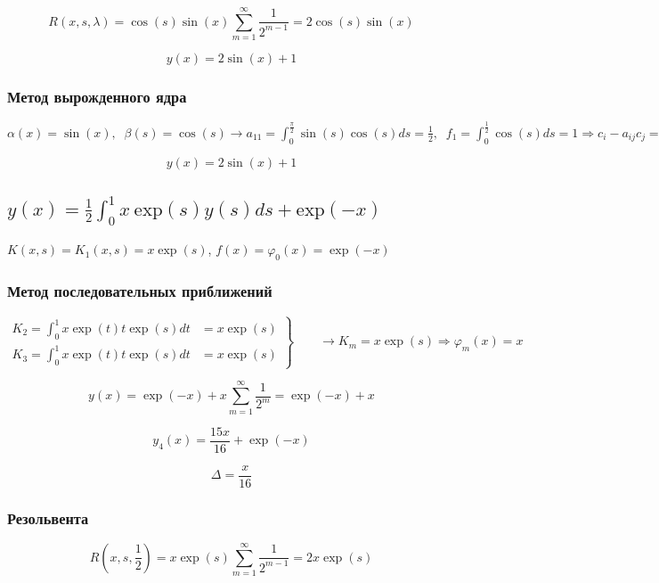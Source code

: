\documentclass[
11pt,
master, %
subf, %
href, %
colorlinks=true, %
times, %
]{disser}
\begin{document}
$$R(x,s,\lambda) = \cos(s)\sin(x)\sum_{m=1}^{\infty} \frac{1}{2^{m-1}} = 2\cos(s)\sin(x)$$

$$y(x) = 2\sin(x) + 1$$

\subsubsection{Метод вырожденного ядра}

$\displaystyle\alpha(x) = \sin(x),\;\;\beta(s) = \cos(s) \rightarrow a_{11} = \int_{0}^{\frac{\pi}{2}} \sin(s) \cos(s) ds = \frac{1}{2}, \;\; f_1 = \int_{0}^{\frac{1}{2}} \cos(s)ds = 1 \Rightarrow c_i - a_{ij} c_j = f_i \Longleftrightarrow c_1 = 2$

$$y(x) = 2\sin(x) + 1$$

\subsection{$\displaystyle y(x) = \frac{1}{2} \int_{0}^{1} x~ \mathrm{exp}(s) y(s)ds + \mathrm{exp}(-x)$}

$K(x,s) = K_1(x,s) = x\exp(s)$, $f(x)= \varphi_0(x) = \exp(-x)$

\subsubsection{Метод последовательных приближений}

\begin{equation}
 \left.\begin{aligned}
        K_2 = \int_{0}^{1} x\exp(t)t\exp(s) dt  &= x\exp(s)\\
        K_3 = \int_{0}^{1} x\exp(t)t\exp(s) dt &= x\exp(s)
       \end{aligned}
 \right\}
 \qquad \longrightarrow K_m = x\exp(s) \Rightarrow \varphi_m(x) = x
\end{equation}

$$y(x) = \exp(-x) + x\sum_{m=1}^{\infty} \frac{1}{2^m} = \exp(-x) + x$$

$$y_4(x) = \frac{15 x}{16}+\exp(-x)$$

$$\Delta = \frac{x}{16}$$

\newpage
\subsubsection{Резольвента}

$$R\left(x,s,\frac{1}{2}\right) = x\exp(s)\sum_{m=1}^{\infty}\frac{1}{2^{m-1}} = 2x\exp(s)$$
\end{document}
